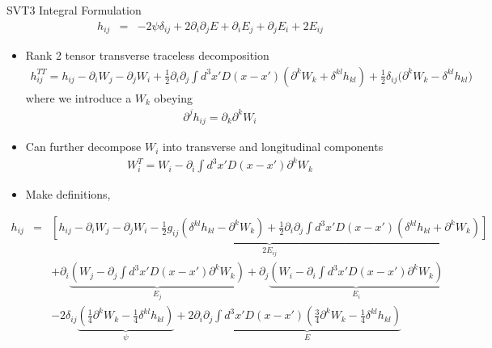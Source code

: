 \documentclass[8pt,aspectratio=1610]{beamer}
\begin{document}
\begin{frame}{SVT3 Integral Formulation}
	\vspace{-4mm}
	\begin{eqnarray}
		h_{ij} &=& -2\psi \delta_{ij} + 2\partial_i \partial_j E + \partial_i E_j + \partial_j E_i + 2E_{ij}
	\end{eqnarray}
	\vspace{-3mm}
	\begin{itemize}
		\item Rank 2 tensor transverse traceless decomposition
	\begin{eqnarray}
	h_{ij}^{TT} = h_{ij} - \partial_i W_j -\partial_j W_i + \frac{1}{2}\partial_i\partial_j \int d^3x' D(x-x')\left(\partial^k W_k + \delta^{kl}h_{kl}\right)
	+ \frac{1}{2}\delta_{ij}\big(\partial^k W_k - \delta^{kl}h_{kl}\big) 
	\end{eqnarray}
	where we introduce a $W_k$ obeying
	\begin{eqnarray}
	\partial^j h_{ij} = \partial_k\partial^k W_i
	\end{eqnarray}
	\item Can further decompose $W_i$ into transverse and longitudinal components
	\begin{eqnarray}
	W_i^T = W_i - \partial_i \int d^3x' D(x-x')\partial^k W_k
	\end{eqnarray}
	\item Make definitions,
	\end{itemize}
	\begin{eqnarray}
	h_{ij}&=&\underbrace{\left[ h_{ij} - \partial_i W_j - \partial_j W_i - \frac12 g_{ij}(\delta^{kl}h_{kl}-\partial^k W_k) + \frac12 \partial_i \partial_j \int d^3x' D(x-x')(\delta^{kl}h_{kl}+\partial^k W_k) \right]}_{\displaystyle{2E_{ij}}}
	\nonumber\\
	&& + \partial_i \underbrace{\left(W_j - \partial_j \int d^3x' D(x-x') \partial^k W_k\right)}_{\displaystyle{E_j}}+
	\partial_j \underbrace{\left(W_i - \partial_i \int d^3x' D(x-x') \partial^k W_k\right)}_{\displaystyle{E_i}}
	\nonumber\\
	&&
	-2 \delta_{ij}\underbrace{\left(\tfrac14\partial^k W_k-\tfrac14 \delta^{kl}h_{kl} \right)}_{\displaystyle\psi}
	+2\partial_i\partial_j \underbrace{\int d^3x' D(x-x') \left(\tfrac34 \partial^k  W_{k}-\tfrac14 \delta^{kl}h_{kl} \right)}_{\displaystyle E}
	\end{eqnarray}
\end{frame}

\end{document}
